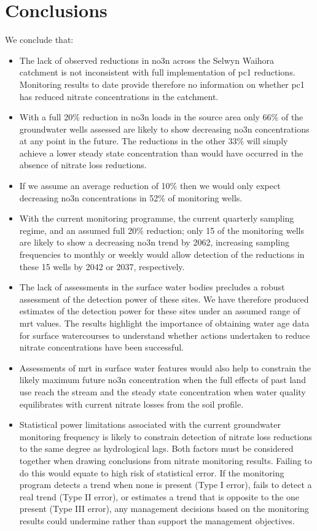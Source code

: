 \pagebreak
\section[Conclusions]{Conclusions} \label{sec:conclusions}

We conclude that:
\begin{itemize}
    \item The lack of observed reductions in \gls{no3n} across the Selwyn Waihora catchment is not inconsistent with full implementation of \gls{pc1} reductions. Monitoring results to date provide therefore no information on whether \gls{pc1} has reduced nitrate concentrations in the catchment.
    \item With a full 20\% reduction in \gls{no3n} loads in the source area only 66\% of the groundwater wells assessed are likely to show decreasing \gls{no3n} concentrations at any point in the future. The reductions in the other 33\% will simply achieve a lower steady state concentration than would have occurred in the absence of nitrate loss reductions.
    \item If we assume an average reduction of 10\% then we would only expect decreasing \gls{no3n} concentrations in 52\% of monitoring wells.
    \item With the current monitoring programme, the current quarterly sampling regime, and an assumed full 20\% reduction; only 15 of the monitoring wells are likely to show a decreasing \gls{no3n} trend by 2062, increasing sampling frequencies to monthly or weekly would allow detection of the reductions in these 15 wells by 2042 or 2037, respectively.
    \item The lack of  assessments in the surface water bodies precludes a robust assessment of the detection power of these sites. We have therefore produced estimates of the detection power for these sites under an assumed range of \gls{mrt} values. The results highlight the importance of obtaining water age data for surface watercourses to understand whether actions undertaken to reduce nitrate concentrations have been successful.
    \item Assessments of \gls{mrt} in surface water features would also help to constrain the likely maximum future \gls{no3n} concentration when the full effects of past land use reach the stream and the steady state concentration when water quality equilibrates with current nitrate losses from the soil profile.
    \item Statistical power limitations associated with the current groundwater monitoring frequency is likely to constrain detection of nitrate loss reductions to the same degree as hydrological lags. Both factors must be considered together when drawing conclusions from nitrate monitoring results. Failing to do this would equate to high risk of statistical error. If the monitoring program detects a trend when none is present (Type I error), fails to detect a real trend (Type II error), or estimates a trend that is opposite to the one present (Type III error), any management decisions based on the monitoring results could undermine rather than support the management objectives.

\end{itemize}

